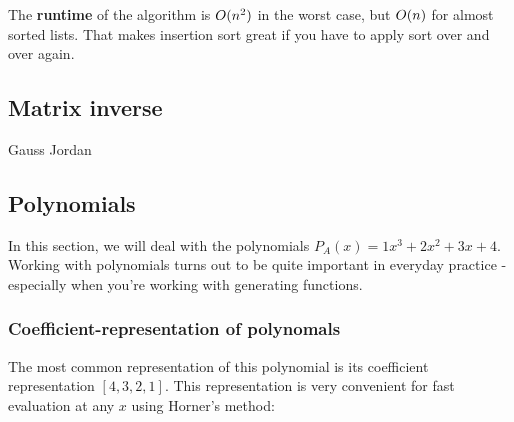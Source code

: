 The \textbf{runtime} of the algorithm is $O(n^2)$ in the worst case, but $O(n)$ for almost sorted lists. That makes insertion sort great if you have to apply sort over and over again.


\subsection{Matrix inverse}
Gauss Jordan

\subsection{Polynomials}
In this section, we will deal with the polynomials $P_A(x) = 1x^3 + 2x^2 + 3x + 4$. Working with polynomials turns out to be quite important in everyday practice - especially when you're working with generating functions.

\subsubsection{Coefficient-representation of polynomals}
The most common representation of this polynomial is its coefficient representation $[4, 3, 2, 1]$. This representation is very convenient for fast evaluation at any $x$ using Horner's method: 

